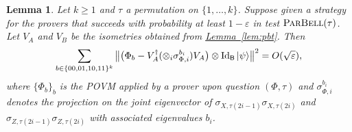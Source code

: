 \documentclass[11pt]{article}
\numberwithin{equation}{section}
\newtheorem{lemma}[theorem]{Lemma}
\theoremstyle{definition}
\theoremstyle{plain}
\newcommand{\expref}[2]{\hyperref[#2]{#1~\ref{#2}}}
\newcommand{\ket}[1]{|#1\rangle}
\newcommand{\Id}{\ensuremath{\mathop{\rm Id}\nolimits}}
\newcommand{\reg}[1]{{\textsf{#1}}}
\newcommand{\eps}{\varepsilon}
\newcommand{\pbellt}{\textsc{ParBell}}
\begin{document}
\begin{lemma}\label{lem:perm-test}
Let $k\geq 1$ and $\tau$ a permutation on $\{1,\ldots,k\}$. Suppose given a strategy for the provers that succeeds with probability at least $1-\eps$ in test $\pbellt(\tau)$. Let $V_A$ and $V_B$ be the isometries obtained from \expref{Lemma}{lem:pbt}. Then 
$$ \sum_{b\in\{00,01,10,11\}^k} \big\|\big(\Phi_b - V_A^\dagger (\otimes_i \sigma_{\Phi,i}^{b_i} ) V_A\big)\otimes \Id_{\reg{B}}\ket{\psi} \big\|^2 = O(\sqrt{\eps}),$$
where $\{\Phi_b\}_b$ is the POVM applied by a prover upon question $(\Phi,\tau)$ and $\sigma_{\Phi,i}^{b_i}$ denotes the projection on the joint eigenvector of $\sigma_{X,\tau(2i-1)}\sigma_{X,\tau(2i)}$ and $\sigma_{Z,\tau(2i-1)}\sigma_{Z,\tau(2i)}$ with associated eigenvalues $b_i$. 
\end{lemma}
\end{document}
